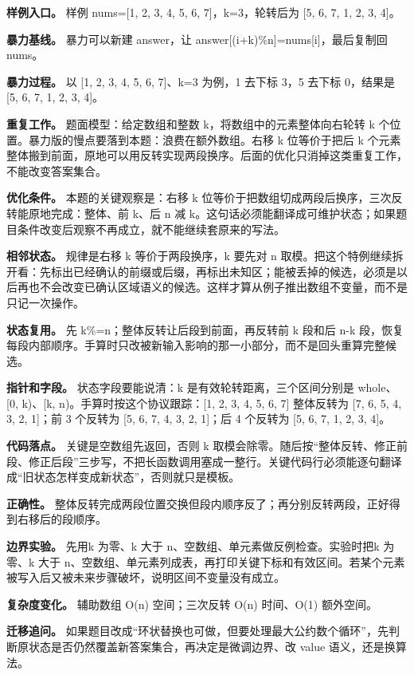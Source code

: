 \textbf{样例入口。} 样例 nums=[1, 2, 3, 4, 5, 6, 7]，k=3，轮转后为 [5, 6, 7, 1, 2, 3, 4]。

\textbf{暴力基线。} 暴力可以新建 answer，让 answer[(i+k)\%n]=nums[i]，最后复制回 nums。

\textbf{暴力过程。} 以 [1, 2, 3, 4, 5, 6, 7]、k=3 为例，1 去下标 3，5 去下标 0，结果是 [5, 6, 7, 1, 2, 3, 4]。

\textbf{重复工作。} 题面模型：给定数组和整数 k，将数组中的元素整体向右轮转 k 个位置。暴力版的慢点要落到本题：浪费在额外数组。右移 k 位等价于把后 k 个元素整体搬到前面，原地可以用反转实现两段换序。后面的优化只消掉这类重复工作，不能改变答案集合。

\textbf{优化条件。} 本题的关键观察是：右移 k 位等价于把数组切成两段后换序，三次反转能原地完成：整体、前 k、后 n 减 k。这句话必须能翻译成可维护状态；如果题目条件改变后观察不再成立，就不能继续套原来的写法。

\textbf{相邻状态。} 规律是右移 k 等价于两段换序，k 要先对 n 取模。把这个特例继续拆开看：先标出已经确认的前缀或后缀，再标出未知区；能被丢掉的候选，必须是以后再也不会改变已确认区域语义的候选。这样才算从例子推出数组不变量，而不是只记一次操作。

\textbf{状态复用。} 先 k\%=n；整体反转让后段到前面，再反转前 k 段和后 n-k 段，恢复每段内部顺序。手算时只改被新输入影响的那一小部分，而不是回头重算完整候选。

\textbf{指针和字段。} 状态字段要能说清：k 是有效轮转距离，三个区间分别是 whole、[0, k)、[k, n)。手算时按这个协议跟踪：[1, 2, 3, 4, 5, 6, 7] 整体反转为 [7, 6, 5, 4, 3, 2, 1]；前 3 个反转为 [5, 6, 7, 4, 3, 2, 1]；后 4 个反转为 [5, 6, 7, 1, 2, 3, 4]。

\textbf{代码落点。} 关键是空数组先返回，否则 k 取模会除零。随后按“整体反转、修正前段、修正后段”三步写，不把长函数调用塞成一整行。关键代码行必须能逐句翻译成“旧状态怎样变成新状态”，否则就只是模板。

\textbf{正确性。} 整体反转完成两段位置交换但段内顺序反了；再分别反转两段，正好得到右移后的段顺序。

\textbf{边界实验。} 先用k 为零、k 大于 n、空数组、单元素做反例检查。实验时把k 为零、k 大于 n、空数组、单元素列成表，再打印关键下标和有效区间。若某个元素被写入后又被未来步骤破坏，说明区间不变量没有成立。

\textbf{复杂度变化。} 辅助数组 O(n) 空间；三次反转 O(n) 时间、O(1) 额外空间。

\textbf{迁移追问。} 如果题目改成“环状替换也可做，但要处理最大公约数个循环”，先判断原状态是否仍然覆盖新答案集合，再决定是微调边界、改 value 语义，还是换算法。

